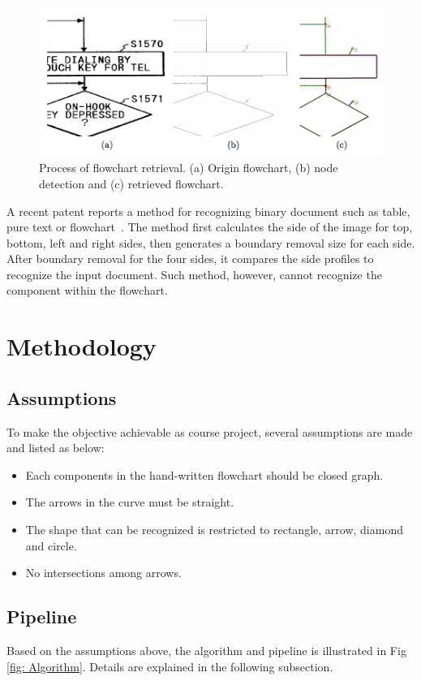 \documentclass[conference,twocolumn]{IEEEtran}
\begin{document}
\begin{figure}[!htbp]
  \center
  \includegraphics[scale=0.4]{RelatedWork.png}
  \caption{Process of flowchart retrieval. (a) Origin flowchart, (b) node detection and (c) retrieved flowchart.}
  \label{fig: RW1}
  \center
\end{figure}
    
    A recent patent reports a method for recognizing binary document such as table, pure text or flowchart~\cite{Ming2018}. The method first calculates the side of the image for top, bottom, left and right sides, then generates a boundary removal size for each side. After boundary removal for the four sides, it compares the side profiles to recognize the input document. Such method, however, cannot recognize the component within the flowchart.


\section{Methodology}
\subsection{Assumptions}
To make the objective achievable as course project, several assumptions are made and listed as below:

\begin{itemize}
    \item Each components in the hand-written flowchart should be closed graph.
    \item The arrows in the curve must be straight.
    \item The shape that can be recognized is restricted to rectangle, arrow, diamond and circle.
    \item No intersections among arrows.
\end{itemize}

\subsection{Pipeline}
Based on the assumptions above, the algorithm and pipeline is illustrated in Fig \ref{fig: Algorithm}. Details are explained in the following subsection.
\end{document}
